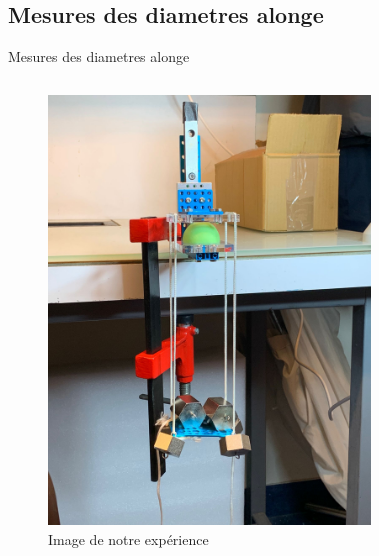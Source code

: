 \documentclass[aspectratio=169,xcolor=dvipsnames]{beamer}
\begin{document}
\subsection{Mesures des diametres alonge}
\begin{frame}{Mesures des diametres alonge}
    \begin{columns}
        \begin{figure}
            \centering
            \includegraphics[height=0.65\textheight]{Figures/IMG-20221205-WA0025.jpg}
            \caption{Image de notre expérience}
            \label{fig:my_label}
        \end{figure}    
        \begin{figure}
            \centering

\end{figure}
\end{columns}
\end{frame}
\end{document}

